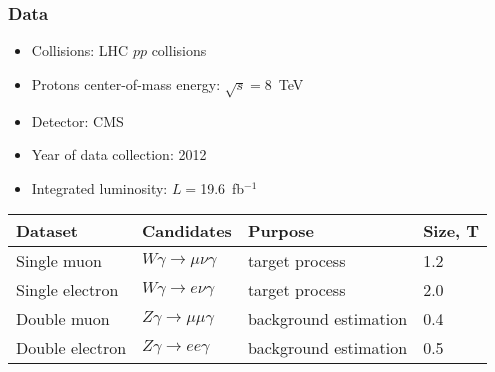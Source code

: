 \begin{frame}\frametitle{Data}
\begin{itemize}
\scriptsize
  \item Collisions: LHC $pp$ collisions
  \item Protons center-of-mass energy: $\sqrt{s}=$8~TeV
  \item Detector: CMS
  \item Year of data collection: 2012
  \item Integrated luminosity: $L=$19.6~fb$^{-1}$  
\end{itemize}

\begin{table}[h]
  \scriptsize
  \begin{center}
    \begin{tabular}{|l|l|l|l|}
      \hline
      Dataset          & Candidates                        &  Purpose   & Size, T   \\ \hline
      Single muon      & $W\gamma\rightarrow\mu\nu\gamma$  &  target process   & 1.2 \\ \hline %
      Single electron  & $W\gamma\rightarrow e\nu\gamma$   &  target process   & 2.0 \\ \hline %
      Double muon      & $Z\gamma\rightarrow\mu\mu\gamma$  &  background estimation   & 0.4 \\ \hline %
      Double electron  & $Z\gamma\rightarrow ee\gamma$     &  background estimation   & 0.5 \\ \hline %
    \end{tabular}
  \end{center}
\end{table} 

\end{frame}%
